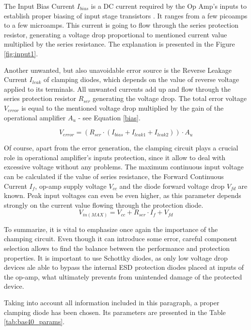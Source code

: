 \documentclass[12pt,a4paper]{article}
\begin{document}
The Input Bias Current $I_{bias}$ is a DC current required by the Op Amp's inputs to establish proper biasing of input stage transistors \cite{companion}. It ranges from a few picoamps to a few microamps. This current is going to flow through the series protection resistor, generating a voltage drop proportional to mentioned current value multiplied by the series resistance. The explanation is presented in the Figure \ref{fig:input1}.
\par

Another unwanted, but also unavoidable error source is the Reverse Leakage Current $I_{leak}$ of clamping diodes, which depends on the value of reverse voltage applied to its terminals.
All unwanted currents add up and flow through the series protection resistor $R_{ser}$ generating the voltage drop. The total error voltage $V_{error}$ is equal to the mentioned voltage drop multiplied by the gain of the operational amplifier $A_u$ - see Equation \ref{bias}.

\begin{equation}
    V_{error} = (R_{ser} \cdot (I_{bias} + I_{leak1} +  I_{leak2})) \cdot A_u
    \label{bias}
\end{equation}
\par

Of course, apart from the error generation, the clamping circuit plays a crucial role in operational amplifier's inputs protection, since it allow to deal with excessive voltage without any problems. The maximum continuous input voltage can be calculated if the value of series resistance, the Forward Continuous Current $I_f$, op-amp supply voltage $V_{cc}$ and the diode forward voltage drop $V_{fd}$ are known. Peak input voltages can even be even higher, as this parameter depends strongly on the current value flowing through the protection diode.
\begin{equation}
    V_{in(MAX)} = V_{cc} + R_{ser} \cdot I_f + V_{fd}
    \label{maxvolt}
\end{equation}
\par 
To summarize, it is vital to emphasize once again the importance of the champing circuit. Even though it can introduce some error, careful component selection allows to find the balance between the performance and protection properties. It is important to use Schottky diodes, as only low voltage drop devices ale able to bypass the internal ESD protection diodes placed at inputs of the op-amp, what ultimately prevents from unintended damage of the protected device.
\par
Taking into account all information included in this paragraph, a proper clamping diode has been chosen. Its parameters are presented in the Table \ref{tab:bas40_params}.
\end{document}
